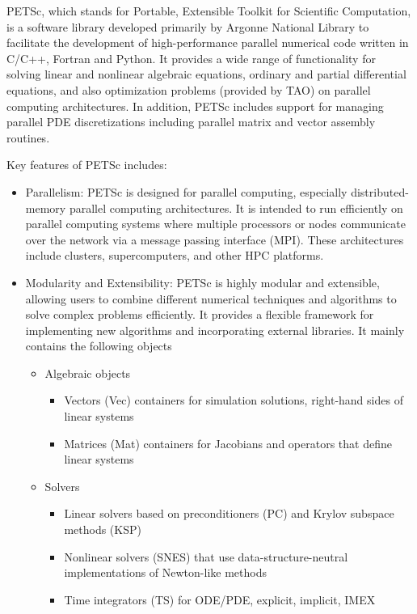 
PETSc, which stands for Portable, Extensible Toolkit for Scientific Computation, is a software library developed primarily by Argonne National Library to facilitate the development of high-performance parallel numerical code written in C/C++, Fortran and Python.
It provides a wide range of functionality for solving linear and nonlinear algebraic equations, ordinary and partial differential equations, and also optimization problems (provided by TAO) on parallel computing architectures.
In addition, PETSc includes support for managing parallel PDE discretizations including parallel matrix and vector assembly routines.

Key features of PETSc includes:
\begin{itemize}
    \item Parallelism: PETSc is designed for parallel computing, especially distributed-memory parallel computing architectures. It is intended to run efficiently on parallel computing systems where multiple processors or nodes communicate over the network via a message passing interface (MPI).
    These architectures include clusters, supercomputers, and other HPC platforms.
    \item Modularity and Extensibility: PETSc is highly modular and extensible, allowing users to combine different numerical techniques and algorithms to solve complex problems efficiently.
    It provides a flexible framework for implementing new algorithms and incorporating external libraries. It mainly contains the following objects
    \begin{itemize}
        \item Algebraic objects 
            \begin{itemize}
                \item Vectors (Vec) containers for simulation solutions, right-hand sides of linear systems
                \item Matrices (Mat) containers for Jacobians and operators that define linear systems
            \end{itemize}
        \item Solvers
            \begin{itemize}
                \item Linear solvers based on preconditioners (PC) and Krylov subspace methods (KSP)
                \item Nonlinear solvers (SNES) that use data-structure-neutral implementations of Newton-like methods
                \item Time integrators (TS) for ODE/PDE, explicit, implicit, IMEX

\end{itemize}
\end{itemize}
\end{itemize}
